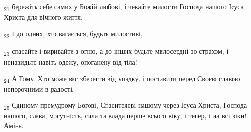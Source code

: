 \begin{tcolorbox}
\textsubscript{21} бережіть себе самих у Божій любові, і чекайте милости Господа нашого Ісуса Христа для вічного життя.
\end{tcolorbox}
\begin{tcolorbox}
\textsubscript{22} І до одних, хто вагається, будьте милостиві,
\end{tcolorbox}
\begin{tcolorbox}
\textsubscript{23} спасайте і виривайте з огню, а до інших будьте милосердні зо страхом, і ненавидьте навіть одежу, опоганену від тіла!
\end{tcolorbox}
\begin{tcolorbox}
\textsubscript{24} А Тому, Хто може вас зберегти від упадку, і поставити перед Своєю славою непорочними в радості,
\end{tcolorbox}
\begin{tcolorbox}
\textsubscript{25} Єдиному премудрому Богові, Спасителеві нашому через Ісуса Христа, Господа нашого, слава, могутність, сила та влада перше всього віку, і тепер, і на всі віки! Амінь.
\end{tcolorbox}
